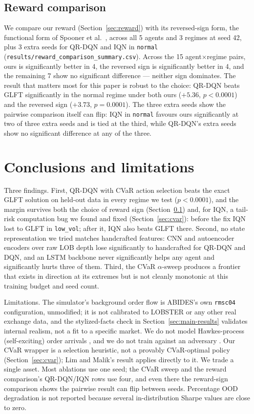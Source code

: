 \documentclass[10pt,twocolumn]{article}
\begin{document}
\subsection{Reward comparison}
\label{sec:reward_comp}
We compare our reward (Section~\ref{sec:reward}) with its reversed-sign form, the functional form of Spooner et al.\ \citep{spooner2018}, across all 5 agents and 3 regimes at seed 42, plus 3 extra seeds for QR-DQN and IQN in \texttt{normal} (\texttt{results/reward\_comparison\_summary.csv}). Across the 15 agent$\times$regime pairs, ours is significantly better in 4, the reversed sign is significantly better in 4, and the remaining 7 show no significant difference --- neither sign dominates. The result that matters most for this paper is robust to the choice: QR-DQN beats GLFT significantly in the normal regime under both ours ($+5.36$, $p<0.0001$) and the reversed sign ($+3.73$, $p=0.0001$). The three extra seeds show the pairwise comparison itself can flip: IQN in \texttt{normal} favours ours significantly at two of three extra seeds and is tied at the third, while QR-DQN's extra seeds show no significant difference at any of the three.

\section{Conclusions and limitations}
\label{sec:limits}

Three findings. First, QR-DQN with CVaR action selection beats the exact GLFT solution on held-out data in every regime we test ($p<0.0001$), and the margin survives both the choice of reward sign (Section~\ref{sec:reward_comp}) and, for IQN, a tail-risk computation bug we found and fixed (Section~\ref{sec:cvar}): before the fix IQN lost to GLFT in \texttt{low\_vol}; after it, IQN also beats GLFT there. Second, no state representation we tried matches handcrafted features: CNN and autoencoder encoders over raw LOB depth lose significantly to handcrafted for QR-DQN and DQN, and an LSTM backbone never significantly helps any agent and significantly hurts three of them. Third, the CVaR $\alpha$-sweep produces a frontier that exists in direction at its extremes but is not cleanly monotonic at this training budget and seed count.

Limitations. The simulator's background order flow is ABIDES's own \texttt{rmsc04} configuration, unmodified; it is not calibrated to LOBSTER or any other real exchange data, and the stylized-facts check in Section~\ref{sec:main-results} validates internal realism, not a fit to a specific market. We do not model Hawkes-process (self-exciting) order arrivals \citep{bacry2015}, and we do not train against an adversary \citep{spooner2020}. Our CVaR wrapper is a selection heuristic, not a provably CVaR-optimal policy (Section~\ref{sec:cvar}); Lim and Malik's result \citep{lim2022} applies directly to it. We trade a single asset. Most ablations use one seed; the CVaR sweep and the reward comparison's QR-DQN/IQN rows use four, and even there the reward-sign comparison shows the pairwise result can flip between seeds. Percentage OOD degradation is not reported because several in-distribution Sharpe values are close to zero.
\end{document}
